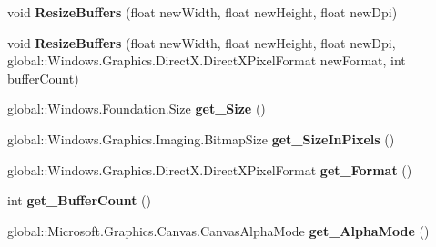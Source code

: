 \begin{DoxyCompactItemize}
void {\bfseries Resize\+Buffers} (float new\+Width, float new\+Height, float new\+Dpi)
\item 
\mbox{\label{interface_microsoft_1_1_graphics_1_1_canvas_1_1_i_canvas_swap_chain_a55aab11b10079cee86acafefd5965e0a}} 
void {\bfseries Resize\+Buffers} (float new\+Width, float new\+Height, float new\+Dpi, global\+::\+Windows.\+Graphics.\+Direct\+X.\+Direct\+X\+Pixel\+Format new\+Format, int buffer\+Count)
\item 
\mbox{\label{interface_microsoft_1_1_graphics_1_1_canvas_1_1_i_canvas_swap_chain_a3c83b45bda7aaacd98cc90d21075f30c}} 
global\+::\+Windows.\+Foundation.\+Size {\bfseries get\+\_\+\+Size} ()
\item 
\mbox{\label{interface_microsoft_1_1_graphics_1_1_canvas_1_1_i_canvas_swap_chain_a3d6681ade03b642ae899d612f2725a9a}} 
global\+::\+Windows.\+Graphics.\+Imaging.\+Bitmap\+Size {\bfseries get\+\_\+\+Size\+In\+Pixels} ()
\item 
\mbox{\label{interface_microsoft_1_1_graphics_1_1_canvas_1_1_i_canvas_swap_chain_a6fb78df6d196feac81f54bcbb0f8dfa4}} 
global\+::\+Windows.\+Graphics.\+Direct\+X.\+Direct\+X\+Pixel\+Format {\bfseries get\+\_\+\+Format} ()
\item 
\mbox{\label{interface_microsoft_1_1_graphics_1_1_canvas_1_1_i_canvas_swap_chain_a33e552e317fa0af44a3768d918cfc3b1}} 
int {\bfseries get\+\_\+\+Buffer\+Count} ()
\item 
\mbox{\label{interface_microsoft_1_1_graphics_1_1_canvas_1_1_i_canvas_swap_chain_aec4483702807638006acc34e237b1e23}} 
global\+::\+Microsoft.\+Graphics.\+Canvas.\+Canvas\+Alpha\+Mode {\bfseries get\+\_\+\+Alpha\+Mode} ()
\item 
\mbox{\label{interface_microsoft_1_1_graphics_1_1_canvas_1_1_i_canvas_swap_chain_a8e56717493f8cd2abe583fe0b23dbc81}} 

\end{DoxyCompactItemize}
